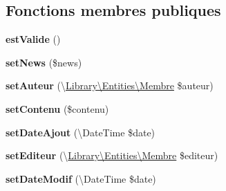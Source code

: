 \subsection*{Fonctions membres publiques}
\begin{DoxyCompactItemize}
\item 
\hypertarget{class_library_1_1_entities_1_1_commentaire_ad2696392106fc5da9c1ab0e5f8985531}{{\bfseries est\+Valide} ()}\label{class_library_1_1_entities_1_1_commentaire_ad2696392106fc5da9c1ab0e5f8985531}

\item 
\hypertarget{class_library_1_1_entities_1_1_commentaire_a804dd6ef06e5603b0e84474a73a3165f}{{\bfseries set\+News} (\$news)}\label{class_library_1_1_entities_1_1_commentaire_a804dd6ef06e5603b0e84474a73a3165f}

\item 
\hypertarget{class_library_1_1_entities_1_1_commentaire_ab247288cbf013f50ac78573ae2bfb1cc}{{\bfseries set\+Auteur} (\textbackslash{}\hyperlink{class_library_1_1_entities_1_1_membre}{Library\textbackslash{}\+Entities\textbackslash{}\+Membre} \$auteur)}\label{class_library_1_1_entities_1_1_commentaire_ab247288cbf013f50ac78573ae2bfb1cc}

\item 
\hypertarget{class_library_1_1_entities_1_1_commentaire_aaf4dd4a7fdb5f42bef0c82425d37191e}{{\bfseries set\+Contenu} (\$contenu)}\label{class_library_1_1_entities_1_1_commentaire_aaf4dd4a7fdb5f42bef0c82425d37191e}

\item 
\hypertarget{class_library_1_1_entities_1_1_commentaire_a2aaadb9f9a1ede972852caa15be46469}{{\bfseries set\+Date\+Ajout} (\textbackslash{}Date\+Time \$date)}\label{class_library_1_1_entities_1_1_commentaire_a2aaadb9f9a1ede972852caa15be46469}

\item 
\hypertarget{class_library_1_1_entities_1_1_commentaire_a30eb9f2c1631e9c510340c89eb60a1c9}{{\bfseries set\+Editeur} (\textbackslash{}\hyperlink{class_library_1_1_entities_1_1_membre}{Library\textbackslash{}\+Entities\textbackslash{}\+Membre} \$editeur)}\label{class_library_1_1_entities_1_1_commentaire_a30eb9f2c1631e9c510340c89eb60a1c9}

\item 
\hypertarget{class_library_1_1_entities_1_1_commentaire_a8f0e484c9b8f472351418ed202bb8800}{{\bfseries set\+Date\+Modif} (\textbackslash{}Date\+Time \$date)}\label{class_library_1_1_entities_1_1_commentaire_a8f0e484c9b8f472351418ed202bb8800}


\end{DoxyCompactItemize}
